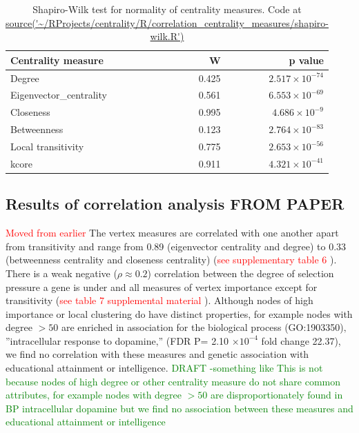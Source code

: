 \begin{table}[ht]
\centering
\begin{tabular}{lrr}
  \hline
Centrality measure & W & p value \\ 
  \hline
Degree & 0.425 & $2.517 \times 10^{-74}$ \\ 
  Eigenvector\_centrality & 0.561 & $6.553 \times 10^{-69}$ \\ 
  Closeness & 0.995 & $4.686 \times 10^{-9}$ \\ 
  Betweenness & 0.123 & $2.764 \times 10^{-83}$ \\ 
  Local transitivity & 0.775 & $2.653 \times 10^{-56}$ \\ 
  kcore & 0.911 & $4.321 \times 10^{-41}$ \\ 
   \hline
\end{tabular}
\caption{Shapiro-Wilk test for normality of centrality measures. Code at \url{source('~/RProjects/centrality/R/correlation_centrality_measures/shapiro-wilk.R')}} 
\label{Table:Test for normality (Shapiro-Wilk) for centrality measures of PSP}
\end{table}

\subsection{Results of correlation analysis FROM PAPER}
\textcolor{red}{Moved from earlier}
The vertex measures are correlated with one another apart from transitivity and range from 0.89 (eigenvector centrality and degree) to 0.33 (betweenness centrality and closeness centrality) (\textcolor{red}{see supplementary table 6} ).
There is a weak negative ($\rho \approx 0.2$) correlation between 
the degree of selection pressure a gene is under and all measures of vertex importance except for transitivity (\textcolor{red}{see table 7 supplemental material} ).
Although nodes of high importance or local clustering do have distinct properties, for example nodes with degree $> 50$ are enriched in association for the biological process (GO:1903350)‚ ”intracellular response to dopamine‚” (FDR P= 2.10 $\times 10^{-4}$ fold change 22.37), we find no correlation with these measures and genetic association with educational attainment or intelligence. 
\textcolor{green}{DRAFT -something like This is not because nodes of high degree or other centrality measure do not share common attributes, for example nodes with degree $>50$ are disproportionately found in BP intracellular dopamine but we find no association between these measures and educational attainment or intelligence}



